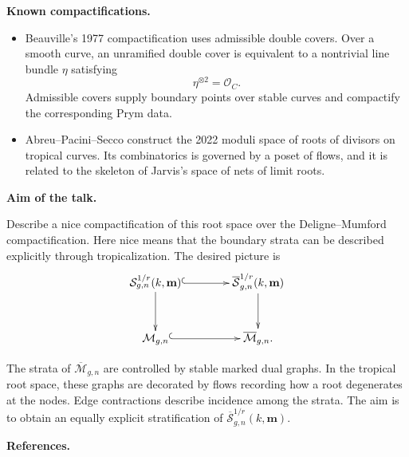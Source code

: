 \medskip\noindent
{\bf Known compactifications.}

\begin{itemize}

\item Beauville's 1977 compactification
uses admissible double covers.  Over a
smooth curve, an unramified double cover
is equivalent to a nontrivial line bundle
$\eta$ satisfying
$$
\eta^{\otimes 2}=\mathcal{O}_C.
$$
Admissible covers supply boundary points
over stable curves and compactify the
corresponding Prym data.

\item Abreu--Pacini--Secco construct the
2022 moduli space of roots of divisors on
tropical curves.  Its combinatorics is
governed by a poset of flows, and it is
related to the skeleton of Jarvis's space
of nets of limit roots.

\end{itemize}

\medskip\noindent
{\bf Aim of the talk.}

Describe a nice compactification of this
root space over the Deligne--Mumford
compactification.  Here nice means that
the boundary strata can be described
explicitly through tropicalization.
The desired picture is
$$
\xymatrix@C=4em@R=3em{
\mathcal{S}^{1/r}_{g,n}
(k,\mathbf{m})
\ar@{^{(}->}[r]\ar[d]
&
\overline{\mathcal{S}}^{1/r}_{g,n}
(k,\mathbf{m})
\ar[d]
\\
\mathcal{M}_{g,n}
\ar@{^{(}->}[r]
&
\overline{\mathcal{M}}_{g,n}.
}
$$

The strata of
$\overline{\mathcal{M}}_{g,n}$ are
controlled by stable marked dual graphs.
In the tropical root space, these graphs
are decorated by flows recording how a
root degenerates at the nodes.  Edge
contractions describe incidence among
the strata.  The aim is to obtain an
equally explicit stratification of
$\overline{\mathcal{S}}^{1/r}_{g,n}
(k,\mathbf{m})$.

\medskip\noindent
{\bf References.}

